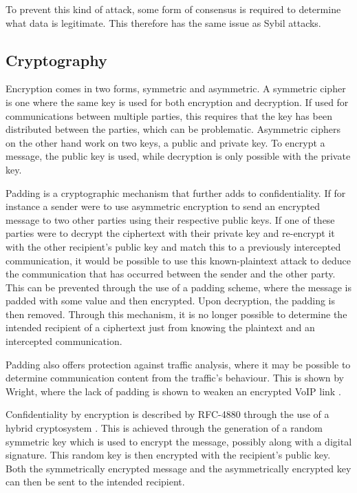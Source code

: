 			To prevent this kind of attack, some form of consensus is required to determine what data is legitimate. This therefore has the same issue as Sybil attacks.
	\subsection{Cryptography}
		Encryption comes in two forms, symmetric and asymmetric. A symmetric cipher is one where the same key is used for both encryption and decryption. If used for communications between multiple parties, this requires that the key has been distributed between the parties, which can be problematic. Asymmetric ciphers on the other hand work on two keys, a public and private key. To encrypt a message, the public key is used, while decryption is only possible with the private key. \cite{appliedcrypto}
		
		Padding is a cryptographic mechanism that further adds to confidentiality. If for instance a sender were to use asymmetric encryption to send an encrypted message to two other parties using their respective public keys. If one of these parties were to decrypt the ciphertext with their private key and re-encrypt it with the other recipient's public key and match this to a previously intercepted communication, it would be possible to use this known-plaintext attack to deduce the communication that has occurred between the sender and the other party. This can be prevented through the use of a padding scheme, where the message is padded with some value and then encrypted. Upon decryption, the padding is then removed. Through this mechanism, it is no longer possible to determine the intended recipient of a ciphertext just from knowing the plaintext and an intercepted communication.
		
		Padding also offers protection against traffic analysis, where it may be possible to determine communication content from the traffic's behaviour. This is shown by Wright, where the lack of padding is shown to weaken an encrypted VoIP link \cite{Wright:2010:USP:1880022.1880029}.
	
		Confidentiality by encryption is described by RFC-4880 through the use of a hybrid cryptosystem \cite{network2007openpgp}. This is achieved through the generation of a random symmetric key which is used to encrypt the message, possibly along with a digital signature. This random key is then encrypted with the recipient's public key. Both the symmetrically encrypted message and the asymmetrically encrypted key can then be sent to the intended recipient.